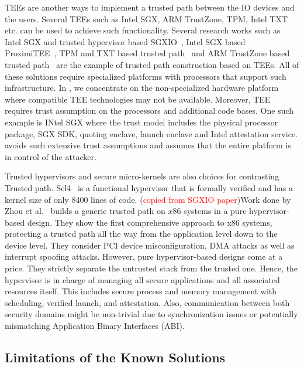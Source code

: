  TEEs are another ways to implement a trusted path between the IO devices and the users. Several TEEs such as Intel SGX, ARM TrustZone, TPM, Intel TXT etc. can be used to achieve such functionality. Several research works such as Intel SGX and trusted hypervisor based SGXIO~\cite{weiser2017sgxio}, Intel SGX based ProximiTEE~\cite{dhar2018proximitee}, TPM and TXT based trusted path~\cite{filyanov2011uni} and ARM TrustZone based trusted path~\cite{filyanov2011uni,sun2015trustotp} are the example of trusted path construction based on TEEs. All of these solutions require specialized platforms with processors that support such infrastructure. In \name, we concentrate on the non-specialized hardware platform where compatible TEE technologies may not be available.
Moreover, TEE requires trust assumption on the processors and additional code bases. One such example is INtel SGX where the trust model includes the physical processor package, SGX SDK, quoting enclave, launch enclave and Intel attestation service. \name avoids such extensive trust assumptions and assumes that the entire platform is in control of the attacker.

 Trusted hypervisors and secure micro-kernels are also choices for contrasting Trusted path. Sel4~\cite{klein2009sel4} is a functional hypervisor that is formally verified and has a kernel size of only $8400$ lines of code. (\textcolor{red}{copied from SGXIO paper})Work done by Zhou et al.~\cite{zhou2012building} builds a generic trusted path on $x86$ systems in a pure hypervisor-based design. They show the first comprehensive approach to x86 systems, protecting a trusted path all the way from the application level down to the device level.  They consider PCI device misconfiguration, DMA attacks as well as interrupt spoofing attacks.  However, pure hypervisor-based designs come at a price.  They strictly separate the untrusted stack from the trusted one.  Hence, the hypervisor is in charge of managing all secure applications and all associated resources itself.  This includes secure process and memory management with scheduling, verified launch, and attestation.  Also, communication between both security domains might be non-trivial due to synchronization issues or potentially mismatching Application Binary Interfaces (ABI).

\subsection{Limitations of the Known Solutions}

